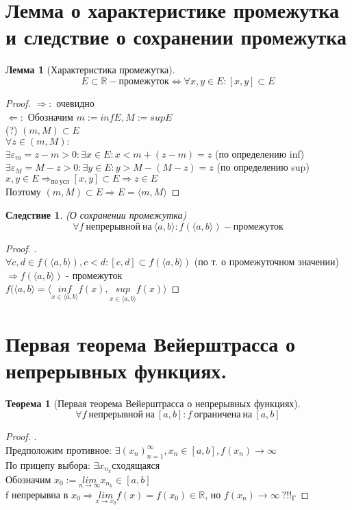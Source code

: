 \documentclass[12pt, a4]{article}
\newtheorem*{theorem}{Теорема}
\newtheorem*{corollary}{Следствие}
\newtheorem*{lemma}{Лемма}
\renewcommand{\lim}[2]{\underset{#1 \rightarrow #2}{lim}}
\renewcommand{\sup}[1]{\underset{#1}{sup}}
\renewcommand{\inf}[1]{\underset{#1}{inf}}
\newcommand{\limn}{\lim{n}{\infty}}
\renewcommand{\implies}{\Rightarrow}
\newcommand{\bimplies}{\Leftarrow}
\renewcommand{\iff}{\Leftrightarrow}
\renewcommand{\epsilon}{\varepsilon}
\newcommand{\interval}[1]{\langle#1\rangle}
\newcommand{\sequence}[2]{(#1_#2)_{#2=1}^\infty}
\newcommand{\sequencen}[1]{\sequence{#1}{n}}
\newcommand{\R}{\mathbb{R}}
\begin{document}
\section{Лемма о характеристике промежутка и следствие о сохранении промежутка}

\begin{lemma}[Характеристика промежутка]
\[E \subset \R - промежуток \iff \forall x, y \in E: [x,y]\subset E\]
\end{lemma}

\begin{proof}
$\implies:$ очевидно\\
$\bimplies:$ Обозначим $m := infE, M := supE$\\
(?) $(m, M) \subset E$\\
$\forall z \in (m, M):$\\
$\exists \epsilon_m = z - m > 0: \exists x \in E: x < m + (z-m) = z$ (по определению inf)\\
$\exists \epsilon_M = M - z > 0: \exists y \in E: y > M - (M-z) = z$ (по определению sup)\\
$x,y \in E \implies_{по\ усл} [x,y] \subset E \implies z \in E$\\
Поэтому $(m, M) \subset E \implies E = \interval{m,M}$
\end{proof}

\begin{corollary}(О сохранении промежутка)
\[\forall f\ непрерывной\ на\ \interval{a,b}: f(\interval{a,b}) - промежуток\]
\end{corollary}

\begin{proof}.\\
$\forall c, d \in f(\interval{a,b}), c < d: [c, d] \subset f(\interval{a,b})$ (по т. о промежуточном значении) $\implies f(\interval{a,b})$ - промежуток\\
$f(\interval{a,b} = \interval{\inf{x\in\interval{a,b}}f(x),\sup{x\in\interval{a,b}}f(x)}$
\end{proof}

\section{Первая теорема Вейерштрасса о непрерывных функциях.}

\begin{theorem}[Первая теорема Вейерштрасса о непрерывных функциях]
\[\forall f\ непрерывной\ на\ [a, b]: f\ ограничена\ на\ [a,b]\]
\end{theorem}
\begin{proof}.\\
Предположим противное: $\exists \sequencen{x}, x_n \in [a, b], f(x_n) \to \infty$\\
По прицепу выбора: $\exists x_{n_k} сходящаяся$\\
Обозначим $x_0 := \limn x_{n_k} \in [a,b]$\\
f непрерывна в $x_0 \implies \lim{x}{x_0}f(x) = f(x_0) \in \R$, но $f(x_n) \to \infty\ ?!!_Г$
\end{proof}
\end{document}
